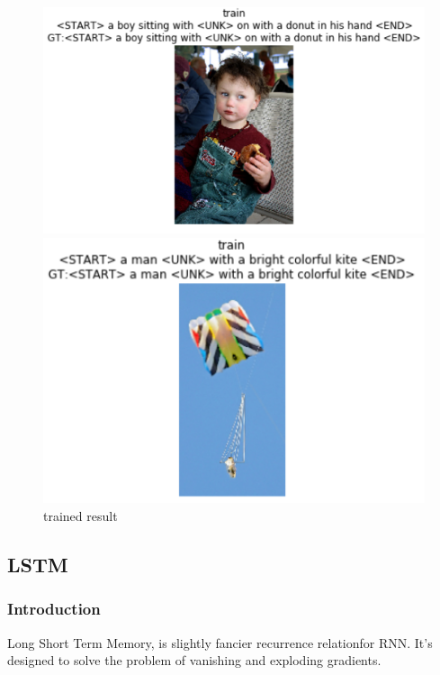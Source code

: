 \documentclass{article}
\begin{document}
\begin{figure}[htbp]
	\centering
	\begin{minipage}[t]{0.5\textwidth}
		\centering
		\includegraphics[width=1.0\textwidth]{4.png}
	\end{minipage}
	\begin{minipage}[t]{0.45\textwidth}
		\centering
		\includegraphics[width=1.0\textwidth]{5.png}
	\end{minipage}
	\caption{trained result}
\end{figure}

\subsection{LSTM}
\subsubsection{Introduction}
Long Short Term Memory, is slightly fancier recurrence relationfor RNN. It's designed to solve the problem of vanishing and exploding gradients.
\end{document}
